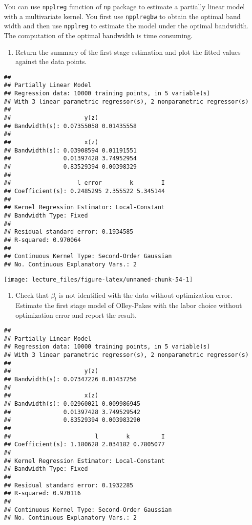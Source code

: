 \documentclass[
]{book}
\providecommand{\tightlist}{%
  \setlength{\itemsep}{0pt}\setlength{\parskip}{0pt}}
\begin{document}
You can use \texttt{npplreg} function of \texttt{np} package to estimate a partially linear model with a multivariate kernel. You first use \texttt{npplregbw} to obtain the optimal band width and then use \texttt{npplreg} to estimate the model under the optimal bandwidth. The computation of the optimal bandwidth is time consuming.

\begin{enumerate}
\def\labelenumi{\arabic{enumi}.}
\setcounter{enumi}{2}
\tightlist
\item
  Return the summary of the first stage estimation and plot the fitted values against the data points.
\end{enumerate}

\begin{verbatim}
## 
## Partially Linear Model
## Regression data: 10000 training points, in 5 variable(s)
## With 3 linear parametric regressor(s), 2 nonparametric regressor(s)
## 
##                     y(z)           
## Bandwidth(s): 0.07355058 0.01435558
## 
##                     x(z)           
## Bandwidth(s): 0.03908594 0.01191551
##               0.01397428 3.74952954
##               0.83529394 0.00398329
## 
##                   l_error        k        I
## Coefficient(s): 0.2485295 2.355522 5.345144
## 
## Kernel Regression Estimator: Local-Constant
## Bandwidth Type: Fixed
## 
## Residual standard error: 0.1934585
## R-squared: 0.970064
## 
## Continuous Kernel Type: Second-Order Gaussian
## No. Continuous Explanatory Vars.: 2
\end{verbatim}

\begin{center}\texttt{[image: lecture\_files/figure-latex/unnamed-chunk-54-1]} \end{center}

\begin{enumerate}
\def\labelenumi{\arabic{enumi}.}
\setcounter{enumi}{3}
\tightlist
\item
  Check that \(\beta_l\) is not identified with the data without optimization error. Estimate the first stage model of Olley-Pakes with the labor choice without optimization error and report the result.
\end{enumerate}

\begin{verbatim}
## 
## Partially Linear Model
## Regression data: 10000 training points, in 5 variable(s)
## With 3 linear parametric regressor(s), 2 nonparametric regressor(s)
## 
##                     y(z)           
## Bandwidth(s): 0.07347226 0.01437256
## 
##                     x(z)            
## Bandwidth(s): 0.02960021 0.009986945
##               0.01397428 3.749529542
##               0.83529394 0.003983290
## 
##                        l        k         I
## Coefficient(s): 1.180628 2.034182 0.7805077
## 
## Kernel Regression Estimator: Local-Constant
## Bandwidth Type: Fixed
## 
## Residual standard error: 0.1932285
## R-squared: 0.970116
## 
## Continuous Kernel Type: Second-Order Gaussian
## No. Continuous Explanatory Vars.: 2
\end{verbatim}
\end{document}
